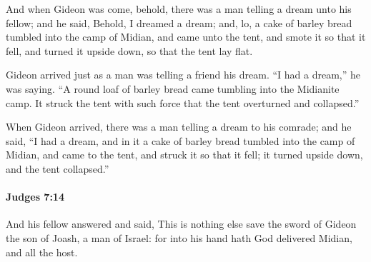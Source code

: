 			\begin{versebox}
					\item[BHS] 
					\item[ASV] And when Gideon was come, behold, there was a man telling a dream unto his fellow; and he said, Behold, I dreamed a dream; and, lo, a cake of barley bread tumbled into the camp of Midian, and came unto the tent, and smote it so that it fell, and turned it upside down, so that the tent lay flat.
					\item[NIV] Gideon arrived just as a man was telling a friend his dream. “I had a dream,” he was saying. “A round loaf of barley bread came tumbling into the Midianite camp. It struck the tent with such force that the tent overturned and collapsed.”
					\item[NRSV] When Gideon arrived, there was a man telling a dream to his comrade; and he said, “I had a dream, and in it a cake of barley bread tumbled into the camp of Midian, and came to the tent, and struck it so that it fell; it turned upside down, and the tent collapsed.”
			\end{versebox}

		\paragraph{Judges 7:14} %
			\label{JUDGES-7-14}

			And his fellow answered and said, This is nothing else save the sword of Gideon the son of Joash, a man of Israel: for into his hand hath God delivered Midian, and all the host.

